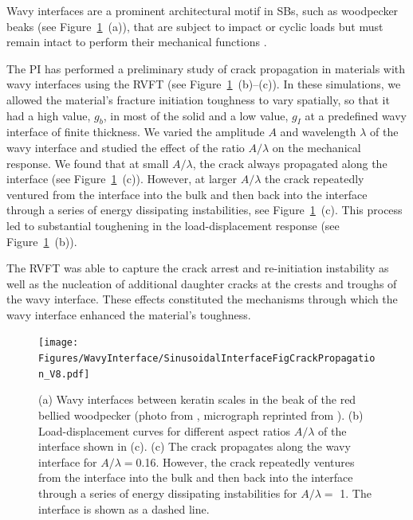 \documentclass[10pt,letterpaper]{article}
\begin{document}
      Wavy interfaces are a prominent architectural motif in SBs, such as woodpecker beaks (see Figure~\ref{f:VFTprelimresults}~(a)), that are subject to impact or cyclic loads but must remain intact to perform their mechanical functions \cite{lee2014hierarchical, jaslow1990mechanical}.

      The PI has performed a preliminary study of crack propagation in materials with wavy interfaces using the RVFT (see Figure~\ref{f:VFTprelimresults}~(b)--(c)). In these simulations, we allowed the material's fracture initiation toughness to vary spatially, so that it had a high value, $g_{b}$, in most of the solid and a low value, $g_{I}$ at a predefined wavy interface of finite thickness. We varied the amplitude $A$ and wavelength $\lambda$ of the wavy interface and studied the effect of the ratio $A/\lambda$ on the mechanical response. We found that at small $A/\lambda$, the crack always propagated along the interface (see Figure~\ref{f:VFTprelimresults}~(c)). However, at larger $A/\lambda$ the crack repeatedly ventured from the interface into the bulk and then back into the interface through a series of energy dissipating instabilities, see Figure~\ref{f:VFTprelimresults}~(c). This process led to substantial toughening in the load-displacement response (see Figure~\ref{f:VFTprelimresults}~(b)).

      The RVFT was able to capture the crack arrest and re-initiation instability as well as the nucleation of additional daughter cracks at the crests and troughs of the wavy interface. These effects constituted the mechanisms through which the wavy interface enhanced the material's toughness.
%
      \begin{figure}[h!]
        \texttt{[image: Figures/WavyInterface/SinusoidalInterfaceFigCrackPropagation\_V8.pdf]}
        \centering
        \caption{ \footnotesize (a) Wavy interfaces between keratin scales in the beak of the red bellied woodpecker (photo from \cite{birdpicture1}, micrograph reprinted from \cite{lee2014hierarchical}). (b) Load-displacement curves for different aspect ratios $A/\lambda$ of the interface shown in (c). (c) The crack propagates along the wavy interface for $A/\lambda=$0.16. However, the crack repeatedly ventures from the interface into the bulk and then back into the interface through a series of energy dissipating instabilities for $A/\lambda=$ 1. The interface is shown as a dashed line.
        }
        \label{f:VFTprelimresults}
      \end{figure}
\end{document}
